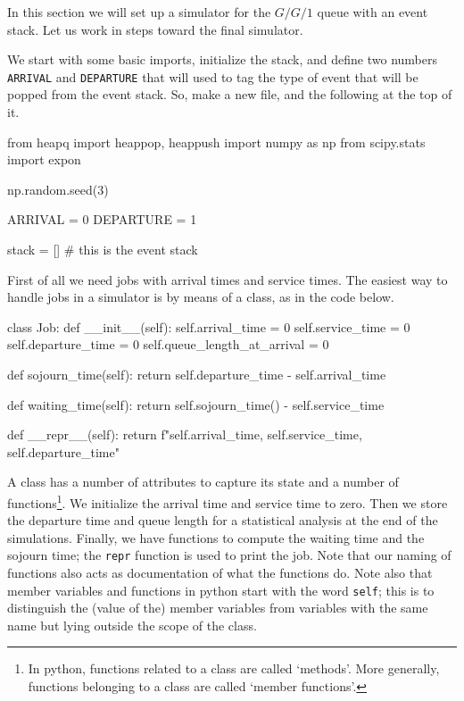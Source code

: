\documentclass{scrartcl}
\begin{document}
In this section we will set up a simulator for the $G/G/1$ queue with  an event stack. Let us work in steps toward the final simulator.

We start with some basic imports,  initialize the stack,  and define two numbers \texttt{ARRIVAL} and \texttt{DEPARTURE} that will used to tag the type of event that will be popped from the event stack. So, make a new file, and the following at the  top of it.

\begin{pyblock}
from heapq import heappop, heappush
import numpy as np 
from scipy.stats import expon

np.random.seed(3)

ARRIVAL = 0
DEPARTURE = 1

stack = [] # this is the event stack
\end{pyblock}


First of all we need jobs with arrival times and service times. The easiest way to handle jobs in a simulator is by means of a class, as in the code below.


\begin{pyblock}
class Job:
    def __init__(self):
        self.arrival_time = 0
        self.service_time = 0
        self.departure_time = 0
        self.queue_length_at_arrival = 0

    def sojourn_time(self):
        return self.departure_time - self.arrival_time

    def waiting_time(self):
        return self.sojourn_time() - self.service_time

    def __repr__(self):
        return f"{self.arrival_time}, {self.service_time}, {self.departure_time}\n"

  
\end{pyblock}

A class has a number of attributes to capture its  state and a number of functions\footnote{In python, functions related to a class are called `methods'. More generally, functions belonging to a class are called `member functions'.}. We initialize the arrival time and service time to zero. Then we store the departure time and queue length for a statistical analysis at the end of the simulations. Finally, we have functions to compute the waiting time and the sojourn time; the \texttt{repr} function is used to print the job. Note that our naming of functions also acts as documentation of what the functions do. Note also that member variables and functions in python start with the word \texttt{self}; this is to distinguish the (value of the) member variables from variables with the same name but lying outside the scope of the class.
\end{document}

